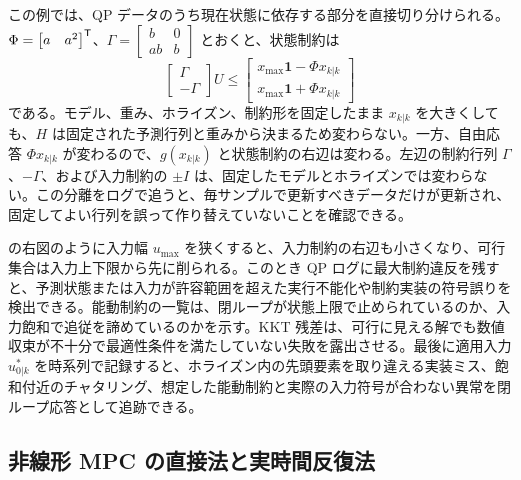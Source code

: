 この例では、QP データのうち現在状態に依存する部分を直接切り分けられる。$\Phi=\begin{bmatrix}a&a^2\end{bmatrix}^{\mathsf{T}}$、$\Gamma=\begin{bmatrix}b&0\\ab&b\end{bmatrix}$ とおくと、状態制約は
\begin{equation}
  \begin{bmatrix}
    \Gamma\\-\Gamma
  \end{bmatrix}U
  \le
  \begin{bmatrix}
    x_{\max}\mathbf{1}-\Phi x_{k|k}\\
    x_{\max}\mathbf{1}+\Phi x_{k|k}
  \end{bmatrix}
\end{equation}
である。モデル、重み、ホライズン、制約形を固定したまま $x_{k|k}$ を大きくしても、$H$ は固定された予測行列と重みから決まるため変わらない。一方、自由応答 $\Phi x_{k|k}$ が変わるので、$g(x_{k|k})$ と状態制約の右辺は変わる。左辺の制約行列 $\Gamma$、$-\Gamma$、および入力制約の $\pm I$ は、固定したモデルとホライズンでは変わらない。この分離をログで追うと、毎サンプルで更新すべきデータだけが更新され、固定してよい行列を誤って作り替えていないことを確認できる。

 の右図のように入力幅 $u_{\max}$ を狭くすると、入力制約の右辺も小さくなり、可行集合は入力上下限から先に削られる。このとき QP ログに最大制約違反を残すと、予測状態または入力が許容範囲を超えた実行不能化や制約実装の符号誤りを検出できる。能動制約の一覧は、閉ループが状態上限で止められているのか、入力飽和で追従を諦めているのかを示す。KKT 残差は、可行に見える解でも数値収束が不十分で最適性条件を満たしていない失敗を露出させる。最後に適用入力 $u^*_{0|k}$ を時系列で記録すると、ホライズン内の先頭要素を取り違える実装ミス、飽和付近のチャタリング、想定した能動制約と実際の入力符号が合わない異常を閉ループ応答として追跡できる。

\subsection{非線形 MPC の直接法と実時間反復法}

